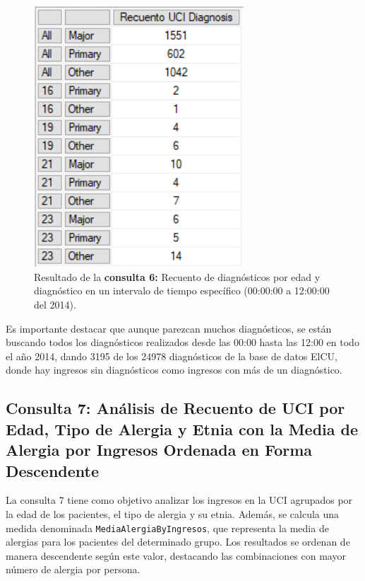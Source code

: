 \documentclass[12pt, a4paper, twoside]{article}
\begin{document}
	\begin{figure}[H]
		\centering
		\includegraphics[width=0.7\textwidth]{image/consulta6.png}
		\caption{Resultado de la \textbf{consulta 6:}  Recuento de diagnósticos por edad y diagnóstico en un intervalo de tiempo específico (00:00:00 a 12:00:00 del 2014).}
		\label{fig:consulta6}
	\end{figure}
	
	Es importante destacar que aunque parezcan muchos diagnósticos, se están buscando todos los diagnósticos realizados desde las 00:00 hasta las 12:00 en todo el año 2014, dando 3195 de los 24978 diagnósticos de la base de datos ElCU, donde hay ingresos sin diagnósticos como ingresos con más de un diagnóstico.
	
	\subsection{Consulta 7: Análisis de Recuento de UCI por Edad, Tipo de Alergia y Etnia con la Media de Alergia por Ingresos Ordenada en Forma Descendente}
	La consulta 7 tiene como objetivo analizar los ingresos en la UCI agrupados por la edad de los pacientes, el tipo de alergia y su etnia. Además, se calcula una medida denominada \texttt{MediaAlergiaByIngresos}, que representa la media de alergias para los pacientes del determinado grupo. Los resultados se ordenan de manera descendente según este valor, destacando las combinaciones con mayor número de alergia por persona.
\end{document}
